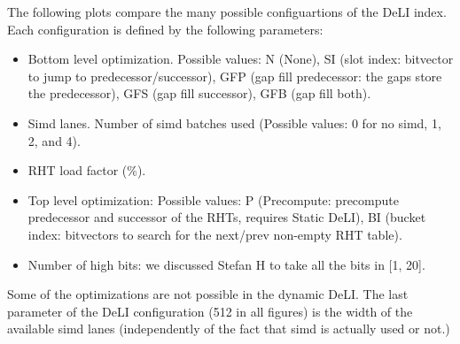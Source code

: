 \documentclass{article}
\begin{document}
The following plots compare the many possible configuartions of the DeLI index. Each configuration is defined by the following parameters:
\begin{itemize}
  \item Bottom level optimization. Possible values: N (None), SI (slot index: bitvector to jump to predecessor/successor), GFP (gap fill predecessor: the gaps store the predecessor), GFS (gap fill successor), GFB (gap fill both).
  \item Simd lanes. Number of simd batches used (Possible values: 0 for no simd, 1, 2, and 4).
  \item RHT load factor (\%).
  \item Top level optimization: Possible values: P (Precompute: precompute predecessor and successor of the RHTs, requires Static DeLI), BI (bucket index: bitvectors to search for the next/prev non-empty RHT table).
  \item Number of high bits: we discussed Stefan H to take all the bits in [1, 20]. 
\end{itemize}
Some of the optimizations are not possible in the dynamic DeLI. The last parameter of the DeLI configuration (512 in all figures) is the width of the available simd lanes (independently of the fact that simd is actually used or not.)



\end{document}
